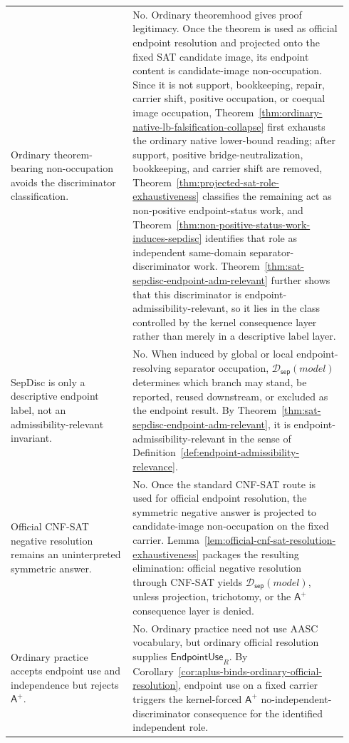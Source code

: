 \documentclass[11pt]{article}
\theoremstyle{definition}
\theoremstyle{remark}
\newcommand{\Aplus}{\mathsf{A}^{+}}
\newcommand{\EndpointUse}{\mathsf{EndpointUse}}
\newcommand{\SepDisc}{\mathcal{D}_{\mathsf{sep}}}
\begin{document}
{\begin{longtable}{>{\raggedright\arraybackslash}p{0.34\linewidth}>{\raggedright\arraybackslash}p{0.60\linewidth}}
Ordinary theorem-bearing non-occupation avoids the discriminator classification. & No. Ordinary theoremhood gives proof legitimacy. Once the theorem is used as official endpoint resolution and projected onto the fixed SAT candidate image, its endpoint content is candidate-image non-occupation. Since it is not support, bookkeeping, repair, carrier shift, positive occupation, or coequal image occupation, Theorem~\ref{thm:ordinary-native-lb-falsification-collapse} first exhausts the ordinary native lower-bound reading; after support, positive bridge-neutralization, bookkeeping, and carrier shift are removed, Theorem~\ref{thm:projected-sat-role-exhaustiveness} classifies the remaining act as non-positive endpoint-status work, and Theorem~\ref{thm:non-positive-status-work-induces-sepdisc} identifies that role as independent same-domain separator-discriminator work. Theorem~\ref{thm:sat-sepdisc-endpoint-adm-relevant} further shows that this discriminator is endpoint-admissibility-relevant, so it lies in the class controlled by the kernel consequence layer rather than merely in a descriptive label layer. \\
SepDisc is only a descriptive endpoint label, not an admissibility-relevant invariant. & No. When induced by global or local endpoint-resolving separator occupation, \(\SepDisc(model)\) determines which branch may stand, be reported, reused downstream, or excluded as the endpoint result. By Theorem~\ref{thm:sat-sepdisc-endpoint-adm-relevant}, it is endpoint-admissibility-relevant in the sense of Definition~\ref{def:endpoint-admissibility-relevance}. \\
Official CNF-SAT negative resolution remains an uninterpreted symmetric answer. & No. Once the standard CNF-SAT route is used for official endpoint resolution, the symmetric negative answer is projected to candidate-image non-occupation on the fixed carrier. Lemma~\ref{lem:official-cnf-sat-resolution-exhaustiveness} packages the resulting elimination: official negative resolution through CNF-SAT yields \(\SepDisc(model)\), unless projection, trichotomy, or the \(\Aplus\) consequence layer is denied. \\
Ordinary practice accepts endpoint use and independence but rejects \(\Aplus\). & No. Ordinary practice need not use AASC vocabulary, but ordinary official resolution supplies \(\EndpointUse_R\). By Corollary~\ref{cor:aplus-binds-ordinary-official-resolution}, endpoint use on a fixed carrier triggers the kernel-forced \(\Aplus\) no-independent-discriminator consequence for the identified independent role. \\

\end{longtable}}
\end{document}
